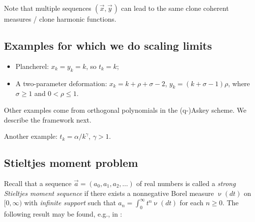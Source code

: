 \documentclass[letterpaper,11pt,oneside,reqno]{article}
\numberwithin{equation}{section}
\newcommand{\ssp}{\hspace{1pt}}
\theoremstyle{definition}
\begin{document}
Note that multiple sequences $(\vec x,\vec{y}\ssp)$ can lead to the same
clone coherent measures / clone harmonic functions.


\subsection{Examples for which we do scaling limits}

\begin{itemize}
	\item Plancherel: $x_k=y_k=k$, so $t_k=k$;
	\item A two-parameter deformation:
		$x_k=k+\rho+\sigma-2$, $y_k=(k+\sigma-1)\rho$,
		where $\sigma\ge 1$ and $0<\rho\le 1$.
\end{itemize}
Other examples come from orthogonal polynomials
in the (q-)Askey scheme. We describe the framework next.

Another example: $t_k=\alpha/k^\gamma$, $\gamma>1$.

\subsection{Stieltjes moment problem}


Recall that a sequence
$\vec{a}=(a_0, a_1, a_2, \dots)$ of real numbers is called a
\emph{strong Stieltjes moment
sequence} if there exists a nonnegative Borel measure $\upnu(dt)$ on $[0,\infty)$
with \emph{infinite support} such that
$a_n = \int_0^\infty t^n  \upnu(dt)$ for each $n \geq 0$.
The following result may be found, e.g.,
in
\cite{sokal2020euler}:
\end{document}
